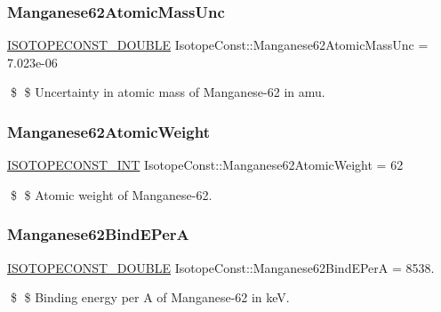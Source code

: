 \subsubsection{\texorpdfstring{Manganese62\+Atomic\+Mass\+Unc}{Manganese62AtomicMassUnc}}
{\footnotesize\ttfamily \mbox{\hyperlink{group___isotope_const-_macros_ga8f45a7272ce02c0b4c65c44636ed719a}{I\+S\+O\+T\+O\+P\+E\+C\+O\+N\+S\+T\+\_\+\+D\+O\+U\+B\+LE}} Isotope\+Const\+::\+Manganese62\+Atomic\+Mass\+Unc = 7.\+023e-\/06}

\$ \$ Uncertainty in atomic mass of Manganese-\/62 in amu. \mbox{\label{group___isotope_const-_manganese-_mn62_gab0648168cde6733fc18ffc9f56ce4166}} 
\subsubsection{\texorpdfstring{Manganese62\+Atomic\+Weight}{Manganese62AtomicWeight}}
{\footnotesize\ttfamily \mbox{\hyperlink{group___isotope_const-_macros_ga5f18360b3e99483a35c32d789e62621c}{I\+S\+O\+T\+O\+P\+E\+C\+O\+N\+S\+T\+\_\+\+I\+NT}} Isotope\+Const\+::\+Manganese62\+Atomic\+Weight = 62}

\$ \$ Atomic weight of Manganese-\/62. \mbox{\label{group___isotope_const-_manganese-_mn62_ga562ef93133a7f80b43305223d0fb5f0a}} 
\subsubsection{\texorpdfstring{Manganese62\+Bind\+E\+PerA}{Manganese62BindEPerA}}
{\footnotesize\ttfamily \mbox{\hyperlink{group___isotope_const-_macros_ga8f45a7272ce02c0b4c65c44636ed719a}{I\+S\+O\+T\+O\+P\+E\+C\+O\+N\+S\+T\+\_\+\+D\+O\+U\+B\+LE}} Isotope\+Const\+::\+Manganese62\+Bind\+E\+PerA = 8538.}

\$ \$ Binding energy per A of Manganese-\/62 in keV. \mbox{\label{group___isotope_const-_manganese-_mn62_ga642d896c879f8731a903fdae20f290c9}} 
